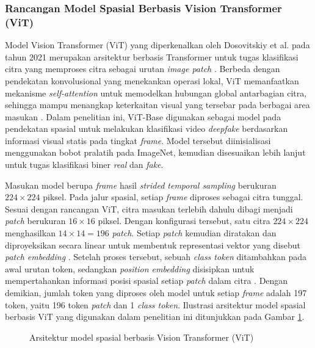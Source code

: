 \subsubsection{Rancangan Model Spasial Berbasis Vision Transformer (ViT)}
Model Vision Transformer (ViT) yang diperkenalkan oleh Dosovitskiy et al. pada tahun 2021 merupakan arsitektur berbasis Transformer untuk tugas klasifikasi citra yang memproses citra sebagai urutan \textit{image patch} \cite{dosovitskiy2021imageworth16x16words}. Berbeda dengan pendekatan konvolusional yang menekankan operasi lokal, ViT memanfaatkan mekanisme \textit{self-attention} untuk memodelkan hubungan global antarbagian citra, sehingga mampu menangkap keterkaitan visual yang tersebar pada berbagai area masukan \cite{dosovitskiy2021imageworth16x16words}. Dalam penelitian ini, ViT-Base digunakan sebagai model pada pendekatan spasial untuk melakukan klasifikasi video \textit{deepfake} berdasarkan informasi visual statis pada tingkat \textit{frame}. Model tersebut diinisialisasi menggunakan bobot pralatih pada ImageNet, kemudian disesuaikan lebih lanjut untuk tugas klasifikasi biner \textit{real} dan \textit{fake}. \par

Masukan model berupa \textit{frame} hasil \textit{strided temporal sampling} berukuran $224 \times 224$ piksel. Pada jalur spasial, setiap \textit{frame} diproses sebagai citra tunggal. Sesuai dengan rancangan ViT, citra masukan terlebih dahulu dibagi menjadi \textit{patch} berukuran $16 \times 16$ piksel. Dengan konfigurasi tersebut, satu citra $224 \times 224$ menghasilkan $14 \times 14 = 196$ \textit{patch}. Setiap \textit{patch} kemudian diratakan dan diproyeksikan secara linear untuk membentuk representasi vektor yang disebut \textit{patch embedding} \cite{dosovitskiy2021imageworth16x16words}. Setelah proses tersebut, sebuah \textit{class token} ditambahkan pada awal urutan token, sedangkan \textit{position embedding} disisipkan untuk mempertahankan informasi posisi spasial setiap \textit{patch} dalam citra \cite{dosovitskiy2021imageworth16x16words}. Dengan demikian, jumlah token yang diproses oleh model untuk setiap \textit{frame} adalah 197 token, yaitu 196 token \textit{patch} dan 1 \textit{class token}. Ilustrasi arsitektur model spasial berbasis ViT yang digunakan dalam penelitian ini ditunjukkan pada Gambar \ref{fig:3.model-vit}. \par

\begin{figure}[H]
	\centering
	\caption{Arsitektur model spasial berbasis Vision Transformer (ViT)}
	\label{fig:3.model-vit}
\end{figure}

